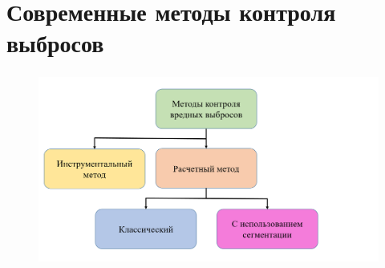 \documentclass[t]{beamer}
\begin{document}
\section[Современные методы]{Современные методы контроля выбросов}
	\begin{frame}
		\frametitle{\insertsection} 
		\begin{figure}
			\centering
			\includegraphics[width = \textwidth]{image/scheme1}	
		\end{figure}
	\end{frame}
\end{document}

